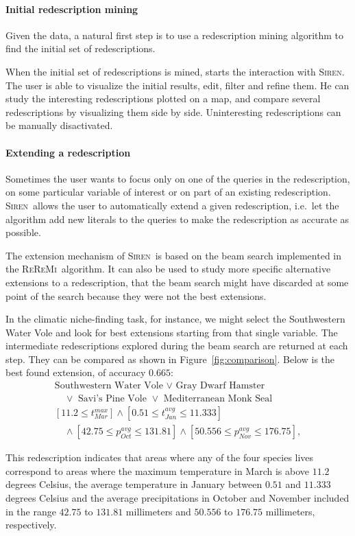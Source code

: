 \documentclass{sig-alternate}
\newcommand{\prg}[1]{\paragraph{#1}}
\newcommand{\Siren}{\textsc{Siren}}
\newcommand{\ReReMi}{\textsc{ReReMi}}
\begin{document}
\prg{Initial redescription mining}
Given the data, a natural first step is to use a redescription mining
algorithm to find the initial set of redescriptions. 

When the initial set of redescriptions is mined, starts the
interaction with \Siren.  The user is able to visualize the initial results,
edit, filter and refine them.  He can study the interesting
redescriptions plotted on a map, and compare several redescriptions by
visualizing them side by side. Uninteresting redescriptions can be
manually disactivated.
 
\prg{Extending a redescription} 
Sometimes the user wants to focus only on one of the queries in the
redescription, on some particular variable of interest or on part of
an existing redescription.  \Siren\ allows the user to automatically
extend a given redescription, i.e.\ let the algorithm add new literals
to the queries to make the redescription as accurate as possible.

The extension mechanism of \Siren\ is based on the beam search
implemented in the \ReReMi\ algorithm.  It can also be used to study
more specific alternative extensions to a redescription, that the beam
search might have discarded at some point of the search because they
were not the best extensions.

In the climatic niche-finding task, for instance, we might select the Southwestern Water Vole and look for best extensions starting from that single variable. The intermediate redescriptions
explored during the beam search are returned at each step. 
They can be compared as shown in Figure~\ref{fig:comparison}. Below is the best found extension, of accuracy $0.665$:
\begin{equation*}
\begin{array}{l}
\text{Southwestern Water Vole }\lor\text{ Gray Dwarf Hamster }\\[1mm]
\quad\lor\text{ Savi's Pine Vole }\lor\text{ Mediterranean Monk Seal}\\[3mm]
[11.2 \leq t_{Mar}^{max}] \land  [0.51 \leq t_{Jan}^{avg} \leq 11.333]\\[1mm]
\quad\land  [42.75 \leq p_{Oct}^{avg} \leq 131.81] \land [50.556 \leq p_{Nov}^{avg} \leq 176.75],
\end{array}
\end{equation*}

This redescription indicates that areas where any of the four
species lives correspond to areas where the maximum temperature in
March is above $11.2$ degrees Celsius, the average temperature in January
between $0.51$ and $11.333$ degrees Celsius and the average precipitations in
October and November included in the range $42.75$ to $131.81$ millimeters and $50.556$ to $176.75$ millimeters, respectively.
\end{document}
